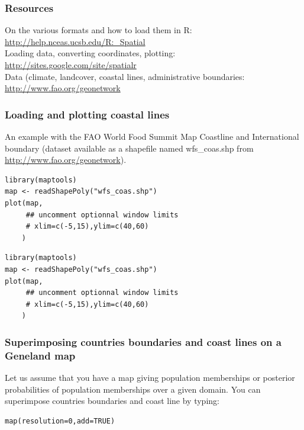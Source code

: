 \documentclass{article}
\begin{document}
\subsubsection{Resources}

On the various formats and how to load them in R: \url{http://help.nceas.ucsb.edu/R:_Spatial}\\

Loading data, converting coordinates, plotting: \url{http://sites.google.com/site/spatialr}\\

Data (climate, landcover, coastal lines, administrative boundaries: \url{http://www.fao.org/geonetwork}\\


\subsubsection{Loading and plotting coastal lines}

An example with the FAO World Food Summit Map Coastline and International boundary (dataset available as a shapefile 
named wfs\_coas.shp from \url{http://www.fao.org/geonetwork}).

\medskip

\begin{verbatim}
library(maptools)
map <- readShapePoly("wfs_coas.shp")
plot(map,
     ## uncomment optionnal window limits
     # xlim=c(-5,15),ylim=c(40,60)
    )
\end{verbatim}


{\footnotesize  
\begin{verbatim}
library(maptools)
map <- readShapePoly("wfs_coas.shp")
plot(map,
     ## uncomment optionnal window limits
     # xlim=c(-5,15),ylim=c(40,60)
    )
\end{verbatim} }


\subsubsection{Superimposing countries boundaries and coast lines on a {\sc Geneland} map}

Let us assume that you have a map giving population memberships or posterior probabilities of population memberships over a given domain. 
You can superimpose countries boundaries and coast line by typing:

\begin{verbatim}
map(resolution=0,add=TRUE)
\end{verbatim}
\end{document}
